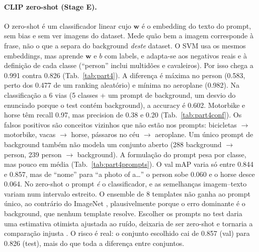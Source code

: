 \begin{table}[h]
\centering
\caption{CLIP zero-shot: AP de validação por conjunto de prompts. Só o
conjunto escolhido (``photo'') foi avaliado no test.}
\label{tab:part4prompts}
\small
{}
\end{table}

\paragraph{CLIP zero-shot (Stage E).}
O zero-shot é um classificador linear cujo $\mathbf{w}$ é o embedding do texto
do prompt, sem bias e sem ver imagens do dataset. Mede quão bem a imagem
corresponde à frase, não o que a separa do background \emph{deste} dataset. O
SVM usa os mesmos embeddings, mas aprende $\mathbf{w}$ e $b$ com labels, e
adapta-se aos negativos reais e à definição de cada classe (``person'' inclui
multidões e cavaleiros). Por isso chega a 0.991 contra 0.826
(Tab.~\ref{tab:part4}). A diferença é máxima no person (0.583, perto dos
0.477 de um ranking aleatório) e mínima no aeroplane (0.982). Na classificação
a 6 vias (5 classes + um prompt de background, um desvio do enunciado porque
o test contém background), a accuracy é 0.602. Motorbike e horse têm recall
0.97, mas precision de 0.38 e 0.20 (Tab.~\ref{tab:part4conf}). Os falsos
positivos são conceitos vizinhos que não estão nos prompts: bicicletas
$\to$ motorbike, vacas $\to$ horse, pássaros no céu $\to$ aeroplane. Um único
prompt de background também não modela um conjunto aberto (288 background
$\to$ person, 239 person $\to$ background). A formulação do prompt pesa por
classe, mas pouco em média (Tab.~\ref{tab:part4prompts}). O val mAP varia só
entre 0.844 e 0.857, mas de ``nome'' para ``a photo of a\dots'' o person
sobe 0.060 e o horse desce 0.064. No zero-shot o prompt \emph{é} o
classificador, e as semelhanças imagem--texto variam num intervalo estreito.
O ensemble de 8 templates não ganha ao prompt único, ao contrário do
ImageNet \cite{radford2021clip}, plausivelmente porque o erro dominante é o
background, que nenhum template resolve. Escolher os prompts no test daria
uma estimativa otimista ajustada ao ruído, deixaria de ser zero-shot e
tornaria a comparação injusta \cite{cawley2010}. O risco é real: o conjunto
escolhido cai de 0.857 (val) para 0.826 (test), mais do que toda a diferença
entre conjuntos.

